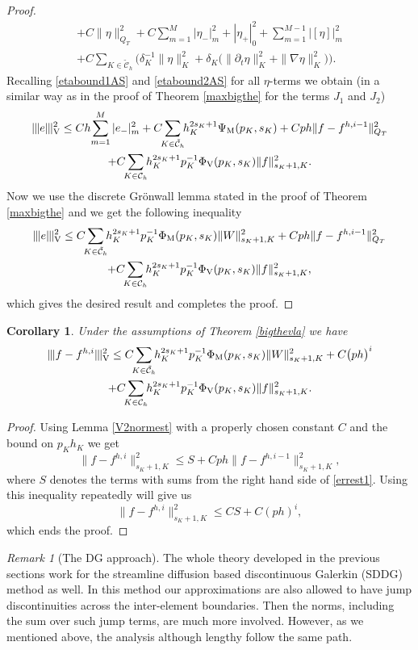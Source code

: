 \documentclass[reqno,a4paper]{amsart}
\newtheorem{corollary}[theorem]{Corollary}
\theoremstyle{remark}
\newtheorem{remark}[theorem]{Remark}
\numberwithin{equation}{section}
\newcommand{\Vnorm}[1]{|\mkern-1mu|\mkern-1mu|#1|\mkern-1mu|\mkern-1mu|_\mathrm{V}}
\def\d{\partial}
\def\sumK{\sum_{K\in\mathcal{\tilde{C}}_h}\!\!}
\def\sumKV{\sum_{K\in\mathcal{C}_h}\!\!}
\begin{document}
\begin{proof}
\begin{multline*}
+C\|\eta\|_{Q_T}^2+C\!\sum_{m=1}^M|\eta_-|^2_m+|\eta_+|^2_0+\sum_{m=1}^{M-1}|[\eta]|^2_m\\
+C\!\!\sumK\Big(\delta_K^{-1}\|\eta\|^2_K
+\delta_K\big(\|\d_t\eta\|_K^2+\|\nabla\eta\|_K^2\big)\Big).
\end{multline*}
Recalling \eqref{etabound1AS} and \eqref{etabound2AS} for all 
$\eta$-terms we obtain
(in a similar way as in the proof of Theorem \ref{maxbigthe} 
for the terms $J_1$ and $J_2$)
\begin{multline*}
\Vnorm{e}^2\leq Ch\!\sum_{m=1}^M|e_-|^2_m
+C\!\!\sumK h_K^{2s_K+1}\Psi_\mathrm{M}(p_K,s_K)+Cph\|f-f^{h,i-1}\|^2_{Q_T}\\
+C\!\!\sumKV h_K^{2s_K+1}p_K^{-1}\Phi_\mathrm{V}(p_K,s_K)\|f\|^2_{s_K+1,K}.
\end{multline*}
Now we use the discrete Gr\"{o}nwall lemma stated in the proof of 
Theorem \ref{maxbigthe}
and we get the following inequality
\begin{multline*}
\Vnorm{e}^2\leq 
C\!\!\sumK h_K^{2s_K+1}p_K^{-1}\Phi_\mathrm{M}(p_K,s_K)\|W\|^2_{s_K+1,K}
+Cph\|f-f^{h,i-1}\|^2_{Q_T}\\
+C\!\!\sumKV h_K^{2s_K+1}p_K^{-1}\Phi_\mathrm{V}(p_K,s_K)\|f\|^2_{s_K+1,K},
\end{multline*}
which gives the desired result and completes the proof. 
\end{proof}

\begin{corollary}
Under the assumptions of Theorem \ref{bigthevla} we have
\begin{multline*}
\Vnorm{f-f^{h,i}}^2\leq 
C\!\!\sumK h_K^{2s_K+1}p_K^{-1}\Phi_\mathrm{M}(p_K,s_K)\|W\|^2_{s_K+1,K}
+C\big(ph\big)^i\\
+C\!\!\sumKV h_K^{2s_K+1}p_K^{-1}\Phi_\mathrm{V}(p_K,s_K)\|f\|^2_{s_K+1,K}.
\end{multline*}
\end{corollary}
\begin{proof}
Using Lemma \ref{V2normest} with a properly chosen constant $C$
and the bound on $p_Kh_K$ we get
\[
\|f-f^{h,i}\|^2_{s_K+1,K}\leq S+Cph\|f-f^{h,i-1}\|^2_{s_K+1,K},
\]
where $S$ denotes the terms with sums from 
the right hand side of \eqref{errest1}.
Using this inequality repeatedly will give us
\[
\|f-f^{h,i}\|^2_{s_K+1,K}\leq CS+C(ph)^i,
\]
which ends the proof.
\end{proof}

\begin{remark}[The DG approach]
The whole theory developed in the previous sections 
work for the streamline diffusion based discontinuous Galerkin (SDDG) 
method as well. 
In this method our approximations are also allowed to have jump 
discontinuities  
across the inter-element boundaries. Then the norms, including 
the sum over such jump terms, are much more involved. 
However, as we mentioned above, the analysis although lengthy 
follow the same path. 
\end{remark}
\end{document}
